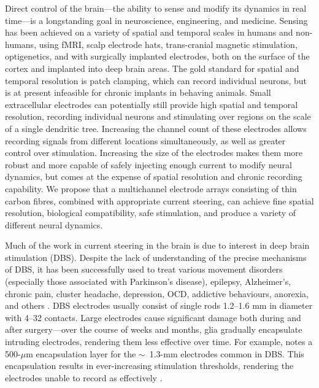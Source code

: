 \documentclass[10pt,letterpaper]{article}
\begin{document}
Direct control of the brain---the ability to sense and modify its
dynamics in real time---is a longstanding goal in neuroscience,
engineering, and medicine. Sensing has been achieved on a variety of
spatial and temporal scales in humans and non-humans, using fMRI,
scalp electrode hats, trans-cranial magnetic stimulation,
optigenetics, and with surgically implanted electrodes, both on the
surface of the cortex and implanted into deep brain areas. The gold
standard for spatial and temporal resolution is patch clamping, which
can record individual neurons, but is at present infeasible for
chronic implants in behaving animals. Small extracellular electrodes
can potentially still provide high spatial and temporal resolution,
recording individual neurons and stimulating over regions on the scale
of a single dendritic tree. Increasing the channel count of these
electrodes allows recording signals from different locations
simultaneously, as well as greater control over
stimulation. Increasing the size of the electrodes makes them more
robust and more capable of safely injecting enough current to modify
neural dynamics, but comes at the expense of spatial resolution and
chronic recording capability. We propose that a multichannel electrode
arrays consisting of thin carbon fibres, combined with appropriate
current steering, can achieve fine spatial resolution, biological
compatibility, safe stimulation, and produce a variety of different
neural dynamics.

Much of the work in current steering in the brain is due to interest
in deep brain stimulation (DBS).  Despite the lack of understanding of
the precise mechanisms of DBS, it has been successfully used to treat
various movement disorders (especially those associated with
Parkinson's disease), epilepsy, Alzheimer's, chronic pain, cluster
headache, depression, OCD, addictive behaviours, anorexia, and others
\cite{Udupa2015dbs}. DBS electrodes usually consist of single rods
1.2--1.6 mm in diameter with 4--32 contacts. Large electrodes cause
significant damage both during and after surgery---over the course of
weeks and months, glia gradually encapsulate intruding electrodes,
rendering them less effective over time. For example,
\cite{Butson2008steering} notes a 500-$\mu$m encapsulation layer for
the $\sim$~1.3-mm electrodes common in DBS.  This encapsulation
results in ever-increasing stimulation thresholds, rendering the
electrodes unable to record as effectively
\cite{Barrese2016electrodestability,Biran2005gliosis,Polikov2005gliosis,Winslow2010gliosis}.
\end{document}
